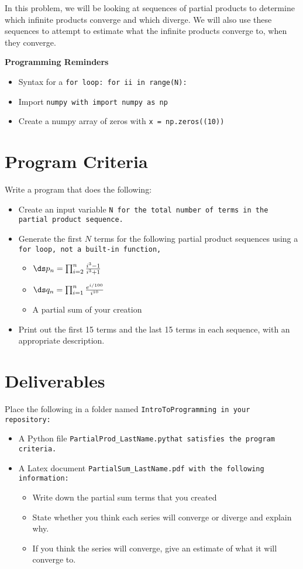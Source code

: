 \documentclass{article}
\def\prog#1{
\vspace{.1in}\begin{mdframed} \begin{center} \textbf{Programming Reminders} \end{center}#1 \end{mdframed} }
\newcommand\foldername{\tt{IntroToProgramming} }
\newcommand\filename{\tt{PartialProd\_LastName.py}\;\;}
\begin{document}
	In this problem, we will be looking at sequences of partial products to determine which infinite products converge and which diverge.  We will also use these sequences to attempt to estimate what the infinite products converge to, when they converge.
	\prog{
		\begin{itemize}
			\item Syntax for a \tt{for} loop: \tt{for ii in range(N):}
			\item Import \tt{numpy} with \tt{import numpy as np}
			\item Create a numpy array of zeros with \tt{x = np.zeros((10))}
		\end{itemize}
		}




\section*{Program Criteria}
	Write a program that does the following:
	\begin{itemize}
		\item Create an input variable \tt{N} for the total number of terms in the partial product sequence.
		\item Generate the first $N$ terms for the following partial product sequences using a \tt{for} loop, not a built-in function,
		\begin{itemize}
			\item $\ds p_n = \prod_{i=2}^n \frac{i^3-1}{i^3+1}$
			\item $\ds q_n = \prod_{i=1}^n \frac{e^{i/100}}{i^{10}}$
			\item A partial sum of your creation
		\end{itemize}
		\item Print out the first 15 terms and the last 15 terms in each sequence, with an appropriate description.
	\end{itemize}







\section*{Deliverables}
	Place the following in a folder named \foldername in your repository:
	\begin{itemize}
		\item A Python file \filename  that satisfies the program criteria.
		\item A Latex document \tt{PartialSum\_LastName.pdf} with the following information:
		\begin{itemize}
			\item Write down the partial sum terms that you created
			\item State whether you think each series will converge or diverge and explain why.
			\item If you think the series will converge, give an estimate of what it will converge to.
		\end{itemize}
	\end{itemize}

	
\end{document}
